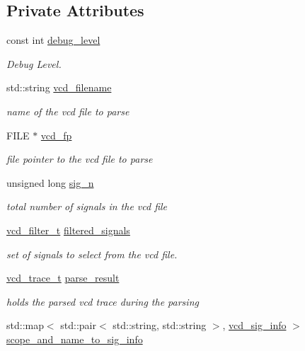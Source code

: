 \subsection*{Private Attributes}
\begin{DoxyCompactItemize}
\item 
const int \hyperlink{classvcd__parser_a7652385eeffd952c7d74bfabe5c95cc6}{debug\+\_\+level}
\begin{DoxyCompactList}\small\item\em Debug Level. \end{DoxyCompactList}\item 
std\+::string \hyperlink{classvcd__parser_a6f6031b88cb087f0f7b6d76b0ce977a1}{vcd\+\_\+filename}
\begin{DoxyCompactList}\small\item\em name of the vcd file to parse \end{DoxyCompactList}\item 
F\+I\+LE $\ast$ \hyperlink{classvcd__parser_aa351a83f30a9cb117d73f08f75928950}{vcd\+\_\+fp}
\begin{DoxyCompactList}\small\item\em file pointer to the vcd file to parse \end{DoxyCompactList}\item 
unsigned long \hyperlink{classvcd__parser_af1b9f01ff54bcc68ca2ec468fa4b245b}{sig\+\_\+n}
\begin{DoxyCompactList}\small\item\em total number of signals in the vcd file \end{DoxyCompactList}\item 
\hyperlink{classvcd__parser_a00f10dd896fdc534014c6192eed18d55}{vcd\+\_\+filter\+\_\+t} \hyperlink{classvcd__parser_a4d2f4adb4710f472ba5dcd7c1cdf98a9}{filtered\+\_\+signals}
\begin{DoxyCompactList}\small\item\em set of signals to select from the vcd file. \end{DoxyCompactList}\item 
\hyperlink{classvcd__parser_a84b85cb9df5165fca362a9da87c5a02f}{vcd\+\_\+trace\+\_\+t} \hyperlink{classvcd__parser_a4196e255ed8ca87224c6f521effe9d4e}{parse\+\_\+result}
\begin{DoxyCompactList}\small\item\em holds the parsed vcd trace during the parsing \end{DoxyCompactList}\item 
std\+::map$<$ std\+::pair$<$ std\+::string, std\+::string $>$, \hyperlink{classvcd__sig__info}{vcd\+\_\+sig\+\_\+info} $>$ \hyperlink{classvcd__parser_a5998e29d09f04bc34b5748770bac3877}{scope\+\_\+and\+\_\+name\+\_\+to\+\_\+sig\+\_\+info}

\end{DoxyCompactItemize}
